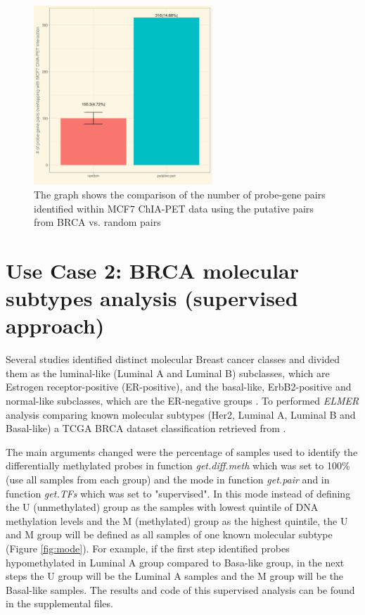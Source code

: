  
%

\begin{figure}[ht!]
\centering
\includegraphics[width=0.6\textwidth]{images/validation.png}
\caption{\label{fig:chiapet} The graph shows the comparison of the number of probe-gene pairs identified within MCF7 ChIA-PET data using the putative pairs from BRCA vs. random pairs}
\end{figure}


\newpage
\section*{Use Case 2: BRCA molecular subtypes analysis (supervised approach)} 

Several studies identified distinct molecular Breast cancer classes and  divided them as the luminal-like (Luminal A and Luminal B) subclasses, which are Estrogen receptor-positive (ER-positive), and the basal-like, ErbB2-positive and normal-like subclasses, which are the ER-negative groups \cite{perou2000molecular,yersal2014biological,sorlie2001gene}.  To performed \textit{ELMER} analysis comparing known molecular subtypes (Her2, Luminal A, Luminal B and Basal-like) a TCGA BRCA dataset classification retrieved from . 


The main arguments changed were the percentage of samples used to identify the differentially methylated probes in function \textit{get.diff.meth} which was set to 100\% (use all samples from each group) and the mode in function \textit{get.pair} and in function \textit{get.TFs} which was set to "supervised". In this mode instead of defining the U (unmethylated) group as the samples with lowest quintile of DNA methylation levels and the M (methylated) group as the highest quintile, the U and M group will be defined as all samples of one known molecular subtype (Figure \ref{fig:mode}). For example, if the first step identified probes hypomethylated in Luminal A group compared to Basa-like group, in the next steps the U group will be the Luminal A samples and the M group will be the Basal-like samples.
The results and code of this supervised analysis can be found in the supplemental files.  

